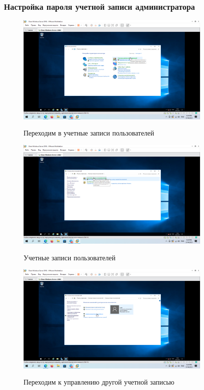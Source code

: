 \documentclass[a4paper]{article}
\begin{document}
  \subsubsection{Настройка пароля учетной записи администратора}

  \begin{figure}[H]
    \centering
    \includegraphics[width=0.85\textwidth]{5_0022}
    \label{img:22}
    \caption{Переходим в учетные записи пользователей}
  \end{figure}

  \begin{figure}[H]
    \centering
    \includegraphics[width=0.85\textwidth]{5_0023}
    \label{img:23}
    \caption{Учетные записи пользователей}
  \end{figure}

  \begin{figure}[H]
    \centering
    \includegraphics[width=0.85\textwidth]{5_0024}
    \label{img:24}
    \caption{Переходим к управлению другой учетной записью}
  \end{figure}
\end{document}

